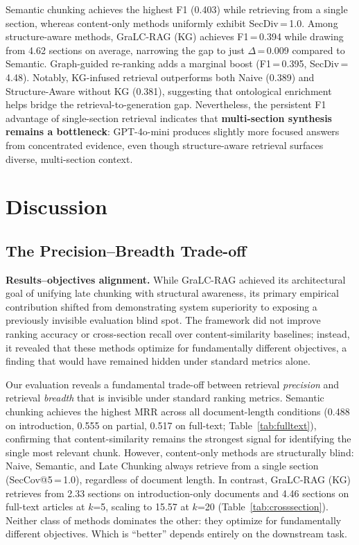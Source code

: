 \documentclass[sn-basic]{sn-jnl}
\newcommand{\gralcrag}{GraLC-RAG}
\begin{document}
Semantic chunking achieves the highest F1 (0.403) while retrieving from a single section, whereas content-only methods uniformly exhibit SecDiv\,=\,1.0. Among structure-aware methods, \gralcrag{} (KG) achieves F1\,=\,0.394 while drawing from 4.62 sections on average, narrowing the gap to just $\Delta$\,=\,0.009 compared to Semantic. Graph-guided re-ranking adds a marginal boost (F1\,=\,0.395, SecDiv\,=\,4.48). Notably, KG-infused retrieval outperforms both Naive (0.389) and Structure-Aware without KG (0.381), suggesting that ontological enrichment helps bridge the retrieval-to-generation gap. Nevertheless, the persistent F1 advantage of single-section retrieval indicates that \textbf{multi-section synthesis remains a bottleneck}: GPT-4o-mini produces slightly more focused answers from concentrated evidence, even though structure-aware retrieval surfaces diverse, multi-section context.

\section{Discussion}\label{sec:discussion}

\subsection{The Precision--Breadth Trade-off}

\textbf{Results--objectives alignment.} While \gralcrag{} achieved its architectural goal of unifying late chunking with structural awareness, its primary empirical contribution shifted from demonstrating system superiority to exposing a previously invisible evaluation blind spot. The framework did not improve ranking accuracy or cross-section recall over content-similarity baselines; instead, it revealed that these methods optimize for fundamentally different objectives, a finding that would have remained hidden under standard metrics alone.

Our evaluation reveals a fundamental trade-off between retrieval \emph{precision} and retrieval \emph{breadth} that is invisible under standard ranking metrics. Semantic chunking achieves the highest MRR across all document-length conditions (0.488 on introduction, 0.555 on partial, 0.517 on full-text; Table~\ref{tab:fulltext}), confirming that content-similarity remains the strongest signal for identifying the single most relevant chunk. However, content-only methods are structurally blind: Naive, Semantic, and Late Chunking always retrieve from a single section (SecCov@5\,=\,1.0), regardless of document length. In contrast, \gralcrag{} (KG) retrieves from 2.33 sections on introduction-only documents and 4.46 sections on full-text articles at $k$=5, scaling to 15.57 at $k$=20 (Table~\ref{tab:crosssection}). Neither class of methods dominates the other: they optimize for fundamentally different objectives. Which is ``better'' depends entirely on the downstream task.
\end{document}
